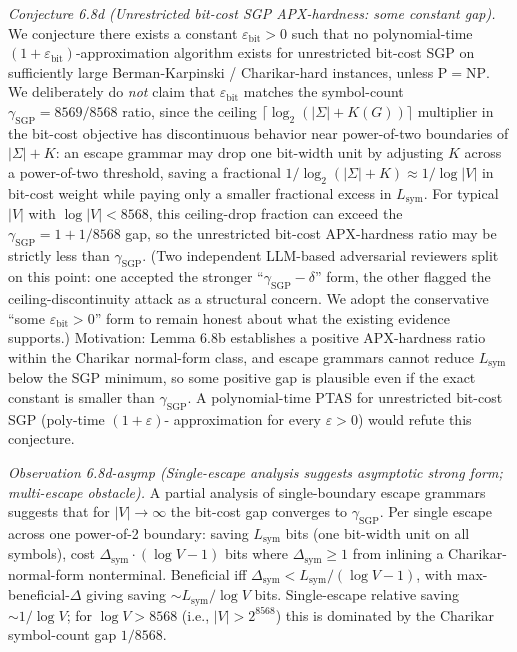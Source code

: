 \documentclass[
]{article}
\begin{document}
\begin{itemize}
  \emph{Conjecture 6.8d (Unrestricted bit-cost SGP APX-hardness:
  some constant gap).} We conjecture there exists a constant
  $\varepsilon_{\mathrm{bit}} > 0$ such that no polynomial-time
  $(1 + \varepsilon_{\mathrm{bit}})$-approximation algorithm exists
  for unrestricted bit-cost SGP on sufficiently large
  Berman-Karpinski / Charikar-hard instances, unless
  $\mathrm{P} = \mathrm{NP}$. We deliberately do \emph{not} claim
  that $\varepsilon_{\mathrm{bit}}$ matches the symbol-count
  $\gamma_{\mathrm{SGP}} = 8569/8568$ ratio, since the ceiling
  $\lceil \log_2(|\Sigma| + K(G)) \rceil$ multiplier in the
  bit-cost objective has discontinuous behavior near
  power-of-two boundaries of $|\Sigma| + K$: an escape grammar
  may drop one bit-width unit by adjusting $K$ across a power-of-two
  threshold, saving a fractional $1/\log_2(|\Sigma|+K) \approx
  1/\log |V|$ in bit-cost weight while paying only a smaller
  fractional excess in $L_{\mathrm{sym}}$. For typical
  $|V|$ with $\log |V| < 8568$, this ceiling-drop fraction can
  exceed the $\gamma_{\mathrm{SGP}} = 1 + 1/8568$ gap, so the
  unrestricted bit-cost APX-hardness ratio may be strictly less
  than $\gamma_{\mathrm{SGP}}$. (Two independent LLM-based
  adversarial reviewers split on this point: one accepted the
  stronger ``$\gamma_{\mathrm{SGP}} - \delta$'' form, the other
  flagged the ceiling-discontinuity attack as a structural concern.
  We adopt the conservative ``some $\varepsilon_{\mathrm{bit}} > 0$''
  form to remain honest about what the existing evidence
  supports.) Motivation: Lemma 6.8b establishes a positive
  APX-hardness ratio within the Charikar normal-form class, and
  escape grammars cannot reduce $L_{\mathrm{sym}}$ below the SGP
  minimum, so some positive gap is plausible even if the exact
  constant is smaller than $\gamma_{\mathrm{SGP}}$. A polynomial-time
  PTAS for unrestricted bit-cost SGP (poly-time $(1 + \varepsilon)$-
  approximation for every $\varepsilon > 0$) would refute this
  conjecture.

  \emph{Observation 6.8d-asymp (Single-escape analysis suggests
  asymptotic strong form; multi-escape obstacle).} A partial analysis
  of single-boundary escape grammars suggests that for $|V| \to \infty$
  the bit-cost gap converges to $\gamma_{\mathrm{SGP}}$. Per single
  escape across one power-of-2 boundary: saving $L_{\mathrm{sym}}$
  bits (one bit-width unit on all symbols), cost
  $\Delta_{\mathrm{sym}} \cdot (\log V - 1)$ bits where
  $\Delta_{\mathrm{sym}} \geq 1$ from inlining a Charikar-normal-form
  nonterminal. Beneficial iff $\Delta_{\mathrm{sym}} < L_{\mathrm{sym}}/(\log V - 1)$,
  with max-beneficial-$\Delta$ giving saving $\sim L_{\mathrm{sym}}/\log V$ bits.
  Single-escape relative saving $\sim 1/\log V$; for $\log V > 8568$
  (i.e., $|V| > 2^{8568}$) this is dominated by the Charikar
  symbol-count gap $1/8568$.


\end{itemize}
\end{document}
